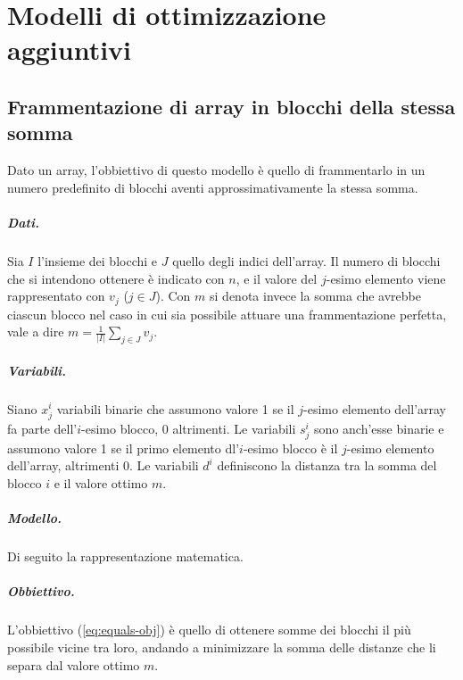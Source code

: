 \chapter{Modelli di ottimizzazione aggiuntivi}
\label{cap:modelli-di-ottimizzazione-framm}

\section{Frammentazione di array in blocchi della stessa somma}
\label{sec:framm-equals}

Dato un array, l'obbiettivo di questo modello è quello di frammentarlo in un numero predefinito di blocchi aventi approssimativamente la stessa somma.


\paragraph{Dati.} Sia $I$ l'insieme dei blocchi e $J$ quello degli indici dell'array. Il numero di blocchi che si intendono ottenere è indicato con $n$, e il valore del $j$-esimo elemento viene rappresentato con $v_j$ ($j \in J$). Con $m$ si denota invece la somma che avrebbe ciascun blocco nel caso in cui sia possibile attuare una frammentazione perfetta, vale a dire $m = \frac{1}{|I|}\sum_{j \in J}v_j$.

\paragraph{Variabili.} Siano $x^i_j$ variabili binarie che assumono valore 1 se il $j$-esimo elemento dell'array fa parte dell'$i$-esimo blocco, 0 altrimenti. Le variabili $s^i_j$ sono anch'esse binarie e assumono valore 1 se il primo elemento dl'$i$-esimo blocco è il $j$-esimo elemento dell'array, altrimenti 0. Le variabili $d^i$ definiscono la distanza tra la somma del blocco $i$ e il valore ottimo $m$.

\paragraph{Modello.} Di seguito la rappresentazione matematica.



\paragraph{Obbiettivo.} L'obbiettivo (\autoref{eq:equals-obj}) è quello di ottenere somme dei blocchi il più possibile vicine tra loro, andando a minimizzare la somma delle distanze che li separa dal valore ottimo $m$.

